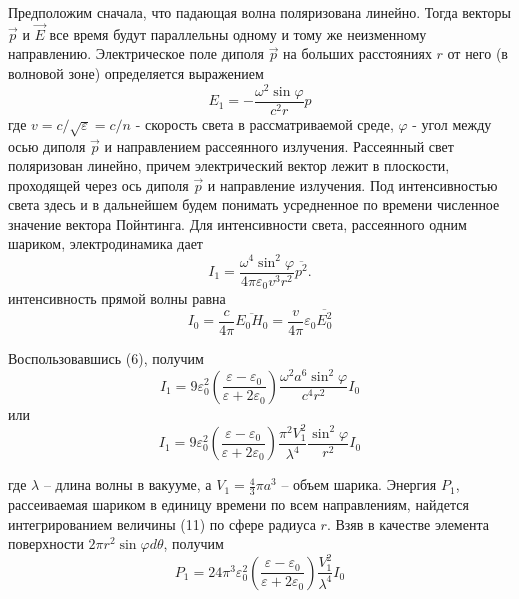 \documentclass[14pt]{article}
\begin{document}
Предположим сначала, что падающая волна поляризована линейно. Тогда векторы $\vec{p}$ и $\vec{E}$ все время будут параллельны одному и тому же неизменному направлению. Электрическое поле диполя $\vec{p}$ на больших расстояниях $r$ от него (в волновой зоне) определяется выражением
\begin{equation}
	E_1 = -\frac{\omega^2\sin\varphi}{c^2r}p
\end{equation}
где $v = c/\sqrt{\varepsilon} = c/n$ - скорость света в рассматриваемой среде, $\varphi$ - угол между осью диполя $\vec{p}$ и направлением рассеянного излучения.  Рассеянный свет поляризован линейно, причем электрический вектор лежит в плоскости, проходящей через ось диполя $\vec{p}$ и направление излучения. Под интенсивностью света здесь и в дальнейшем будем понимать усредненное по времени численное значение вектора Пойнтинга. Для интенсивности света, рассеянного одним шариком, электродинамика дает
\begin{equation}
	I_1 = \frac{\omega^4\sin^2\varphi}{4\pi\varepsilon_0v^3r^2}\overline{p^2}.
\end{equation}
интенсивность прямой волны равна
\begin{equation}
	I_0 = \frac{c}{4\pi}\overline{E_0H_0} = \frac{v}{4\pi}\varepsilon_0\overline{E_0^2}
\end{equation}

Воспользовавшись (6), получим
\begin{equation}
	I_1 = 9\varepsilon_0^2\left(\frac{\varepsilon - \varepsilon_0}{\varepsilon + 2\varepsilon_0}\right)\frac{\omega^2a^6\sin^2\varphi}{c^4r^2}I_0
\end{equation}
или
\begin{equation}
	I_1 = 9\varepsilon_0^2\left(\frac{\varepsilon - \varepsilon_0}{\varepsilon + 2\varepsilon_0}\right)\frac{\pi^2V_1^2}{\lambda^4}\frac{\sin^2\varphi}{r^2}I_0
\end{equation}

где $\lambda$ -- длина волны в вакууме, а $V_1 = \frac{4}{3}\pi a^3$ -- объем шарика. Энергия $P_1$, рассеиваемая шариком в единицу времени по всем направлениям, найдется интегрированием величины (11) по сфере радиуса $r$. Взяв в качестве элемента поверхности $2\pi r^2\sin\varphi d\theta$, получим
\begin{equation}
	P_1 = 24\pi^3\varepsilon_0^2\left(\frac{\varepsilon - \varepsilon_0}{\varepsilon + 2\varepsilon_0}\right)\frac{V_1^2}{\lambda^4}I_0
\end{equation}
\end{document}
